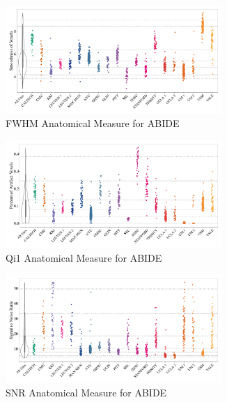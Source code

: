 \documentclass{frontiersSCNS} %
\begin{document}
\begin{figure}[!ht]
     \begin{subfigure}[b]{0.9\textwidth}
       \includegraphics[width=0.9\textwidth]{fig1_ABIDE_Anatomical_fwhm}
       \caption{FWHM Anatomical Measure for ABIDE}
     \end{subfigure}
     \begin{subfigure}[b]{0.9\textwidth}
       \includegraphics[width=0.9\textwidth]{fig1_ABIDE_Anatomical_qi1}
       \caption{Qi1 Anatomical Measure for ABIDE}
     \end{subfigure}
     \begin{subfigure}[b]{0.9\textwidth}
       \includegraphics[width=0.9\textwidth]{fig1_ABIDE_Anatomical_snr}
       \caption{SNR Anatomical Measure for ABIDE}
     \end{subfigure}
     \begin{subfigure}[b]{0.9\textwidth}

\end{subfigure}
\end{figure}
\end{document}
